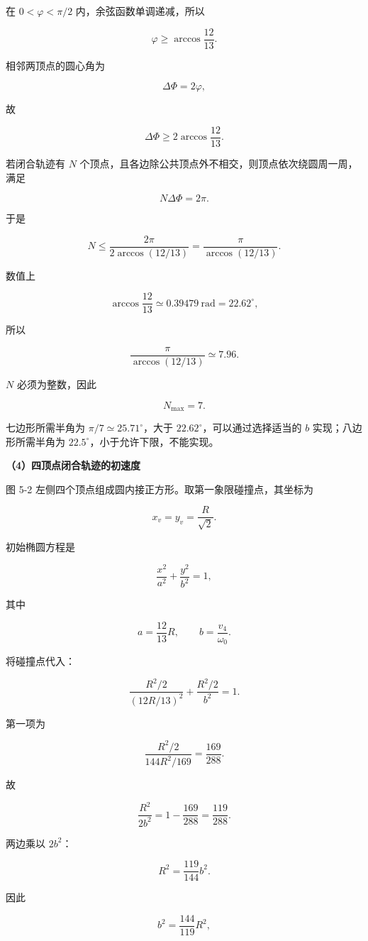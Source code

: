 \documentclass[12pt,a4paper,UTF8]{ctexart}
\begin{document}
在 \(0<\varphi<\pi/2\) 内，余弦函数单调递减，所以

\[
\boxed{\varphi\ge\arccos\frac{12}{13}}.
\]

相邻两顶点的圆心角为

\[
\Delta\Phi=2\varphi,
\]

故

\[
\boxed{\Delta\Phi\ge2\arccos\frac{12}{13}}.
\]

若闭合轨迹有 \(N\)
个顶点，且各边除公共顶点外不相交，则顶点依次绕圆周一周，满足

\[N\Delta\Phi=2\pi.\]

于是

\[
N\le\frac{2\pi}{2\arccos(12/13)}
=\frac{\pi}{\arccos(12/13)}.
\]

数值上

\[
\arccos\frac{12}{13}\simeq0.39479\ \mathrm{rad}
=22.62^\circ,
\]

所以

\[
\frac{\pi}{\arccos(12/13)}\simeq7.96.
\]

\(N\) 必须为整数，因此

\[
\boxed{N_{\max}=7}.
\]

七边形所需半角为 \(\pi/7\simeq25.71^\circ\)，大于
\(22.62^\circ\)，可以通过选择适当的 \(b\) 实现；八边形所需半角为
\(22.5^\circ\)，小于允许下限，不能实现。

\textbf{（4）四顶点闭合轨迹的初速度}

图 5-2 左侧四个顶点组成圆内接正方形。取第一象限碰撞点，其坐标为

\[
x_v=y_v=\frac{R}{\sqrt2}.
\]

初始椭圆方程是

\[
\frac{x^2}{a^2}+\frac{y^2}{b^2}=1,
\]

其中

\[a=\frac{12}{13}R,\qquad b=\frac{v_4}{\omega_0}.\]

将碰撞点代入：

\[
\frac{R^2/2}{(12R/13)^2}
+\frac{R^2/2}{b^2}=1.
\]

第一项为

\[
\frac{R^2/2}{144R^2/169}=\frac{169}{288}.
\]

故

\[
\frac{R^2}{2b^2}=1-\frac{169}{288}=\frac{119}{288}.
\]

两边乘以 \(2b^2\)：

\[
R^2=\frac{119}{144}b^2.
\]

因此

\[
b^2=\frac{144}{119}R^2,
\]
\end{document}
